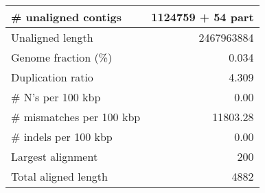 \documentclass[12pt,a4paper]{article}
\begin{document}
\begin{table}[ht]
\begin{center}
\begin{tabular}{|l*{1}{|r}|}
\# unaligned contigs & 1124759 + 54 part \\ \hline
Unaligned length & 2467963884 \\ \hline
Genome fraction (\%) & 0.034 \\ \hline
Duplication ratio & 4.309 \\ \hline
\# N's per 100 kbp & 0.00 \\ \hline
\# mismatches per 100 kbp & 11803.28 \\ \hline
\# indels per 100 kbp & 0.00 \\ \hline
Largest alignment & 200 \\ \hline
Total aligned length & 4882 \\ \hline
\end{tabular}
\end{center}
\end{table}
\end{document}
